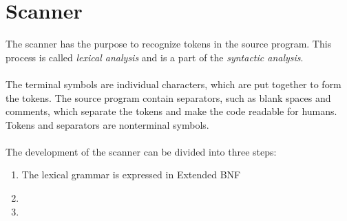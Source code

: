 \section{Scanner}
The scanner has the purpose to recognize tokens in the source program. This process is called \textit{lexical analysis} and is a part of the \textit{syntactic analysis}.
\\
\\
The terminal symbols are individual characters, which are put together to form the tokens\cite{misc:spo}. The source program contain separators, such as blank spaces and comments, which separate the tokens and make the code readable for humans. Tokens and separators are nonterminal symbols.
\\
\\
The development of the scanner can be divided into three steps:

\begin{enumerate}
	\item The lexical grammar is expressed in Extended BNF
	\item
	\item
\end{enumerate}